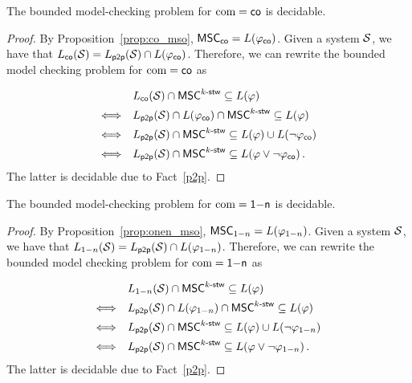 \documentclass{article}
\begin{document}
\begin{theorem}
	\label{thm:co_bounded_model_checking}
	The bounded model-checking problem for $\textup{com} =  \mathsf{co}$ is decidable.
\end{theorem}
\begin{proof}
By Proposition~\ref{prop:co_mso}, $\mathsf{MSC}_{\mathsf{co}}=L(\varphi_{\mathsf{co}})$. Given a system $\mathcal{S}$, we have that $L_{\mathsf{co}}(\mathcal{S}) = L_{\mathsf{p2p}}(\mathcal{S}) \cap L(\varphi_{\mathsf{co}})$. Therefore, we can rewrite the bounded model checking problem for $\textup{com} = \mathsf{co}$ as

\[\begin{array}{rl}
&L_{\mathsf{co}}(\mathcal{S}) \cap \mathsf{MSC}^{k\textup{-}\mathsf{stw}} \subseteq L(\varphi)\\[1ex]
\Longleftrightarrow &L_{\mathsf{p2p}}(\mathcal{S}) \cap L(\varphi_{\mathsf{co}}) \cap \mathsf{MSC}^{k\textup{-}\mathsf{stw}} \subseteq L(\varphi)\\[1ex]
\Longleftrightarrow &L_{\mathsf{p2p}}(\mathcal{S}) \cap \mathsf{MSC}^{k\textup{-}\mathsf{stw}} \subseteq L(\varphi) \cup L(\neg \varphi_{\mathsf{co}})\\[1ex]
\Longleftrightarrow &L_{\mathsf{p2p}}(\mathcal{S}) \cap \mathsf{MSC}^{k\textup{-}\mathsf{stw}} \subseteq L(\varphi \vee \neg \varphi_{\mathsf{co}})\,.
\end{array}\]
The latter is decidable due to Fact~\ref{p2p}.
\end{proof}

\begin{theorem}
	\label{thm:onen_bounded_model_checking}
	The bounded model-checking problem for $\textup{com} =  \mathsf{1\mathsf{-}n}$ is decidable.
\end{theorem}
\begin{proof}
By Proposition~\ref{prop:onen_mso}, $\mathsf{MSC}_{1\mathsf{-}n}=L(\varphi_{1\mathsf{-}n})$. Given a system $\mathcal{S}$, we have that $L_{1\mathsf{-}n}(\mathcal{S}) = L_{\mathsf{p2p}}(\mathcal{S}) \cap L(\varphi_{1\mathsf{-}n})$. Therefore, we can rewrite the bounded model checking problem for $\textup{com} = \mathsf{1\mathsf{-}n}$ as

\[\begin{array}{rl}
&L_{1\mathsf{-}n}(\mathcal{S}) \cap \mathsf{MSC}^{k\textup{-}\mathsf{stw}} \subseteq L(\varphi)\\[1ex]
\Longleftrightarrow &L_{\mathsf{p2p}}(\mathcal{S}) \cap L(\varphi_{1\mathsf{-}n}) \cap \mathsf{MSC}^{k\textup{-}\mathsf{stw}} \subseteq L(\varphi)\\[1ex]
\Longleftrightarrow &L_{\mathsf{p2p}}(\mathcal{S}) \cap \mathsf{MSC}^{k\textup{-}\mathsf{stw}} \subseteq L(\varphi) \cup L(\neg \varphi_{1\mathsf{-}n})\\[1ex]
\Longleftrightarrow &L_{\mathsf{p2p}}(\mathcal{S}) \cap \mathsf{MSC}^{k\textup{-}\mathsf{stw}} \subseteq L(\varphi \vee \neg \varphi_{1\mathsf{-}n})\,.
\end{array}\]
The latter is decidable due to Fact~\ref{p2p}.
\end{proof}
\end{document}
